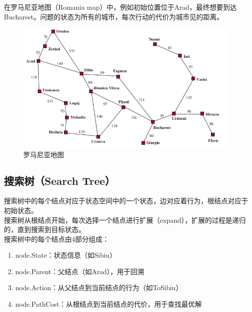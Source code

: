 在罗马尼亚地图（Romania map）中，例如初始位置位于Arad，最终想要到达Bucharest。问题的状态为所有的城市，每次行动的代价为城市见的距离。

\begin{figure}[H]
    \centering
    \includegraphics{img/C1/1-3/2.png}
    \caption{罗马尼亚地图}
\end{figure}

\vspace{0.5cm}

\subsection{搜索树（Search Tree）}

搜索树中的每个结点对应于状态空间中的一个状态，边对应着行为，根结点对应于初始状态。\\

搜索树从根结点开始，每次选择一个结点进行扩展（expand），扩展的过程是递归的，直到搜索到目标状态。\\

搜索树中的每个结点由4部分组成：

\begin{enumerate}
    \item node.State：状态信息（如Sibiu）
    \item node.Parent：父结点（如Arad），用于回溯
    \item node.Action：从父结点到当前结点的行为（如ToSibiu）
    \item node.PathCost：从根结点到当前结点的代价，用于查找最优解
\end{enumerate}

